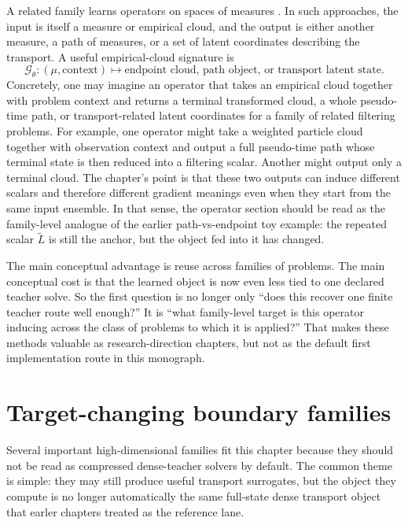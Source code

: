 A related family learns operators on spaces of measures
\citep{lu2021deeponet,li2021fourier,kovachki2023neuraloperator}.  In such
approaches, the input is itself a measure or empirical cloud, and the output is
either another measure, a path of measures, or a set of latent coordinates
describing the transport.  A useful empirical-cloud signature is
\begin{equation}
\label{eq:bf-neural-ot-dynamic-operator-signature}
  \mathcal G_\theta:
  (\mu,\text{context})
  \longmapsto
  \text{endpoint cloud, path object, or transport latent state}.
\end{equation}
Concretely, one may imagine an operator that takes an empirical cloud together
with problem context and returns a terminal transformed cloud, a whole pseudo-time
path, or transport-related latent coordinates for a family of related filtering
problems.  For example, one operator might take a weighted particle cloud together
with observation context and output a full pseudo-time path whose terminal state is
then reduced into a filtering scalar.  Another might output only a terminal cloud.
The chapter's point is that these two outputs can induce different scalars and
therefore different gradient meanings even when they start from the same input
ensemble.  In that sense, the operator section should be read as the family-level
analogue of the earlier path-vs-endpoint toy example: the repeated scalar
\(\widetilde L\) is still the anchor, but the object fed into it has changed.

The main conceptual advantage is reuse across families of problems.  The main
conceptual cost is that the learned object is now even less tied to one declared
teacher solve.  So the first question is no longer only ``does this recover one
finite teacher route well enough?''  It is ``what family-level target is this
operator inducing across the class of problems to which it is applied?''  That
makes these methods valuable as research-direction chapters, but not as the
default first implementation route in this monograph.

\section{Target-changing boundary families}
\label{sec:bf-neural-ot-dynamic-boundary-families}

Several important high-dimensional families fit this chapter because they should
not be read as compressed dense-teacher solvers by default.  The common theme is
simple: they may still produce useful transport surrogates, but the object they
compute is no longer automatically the same full-state dense transport object that
earler chapters treated as the reference lane.

